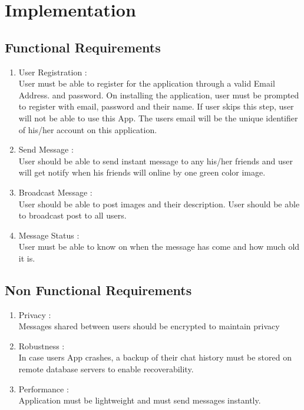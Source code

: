 \section{Implementation}
\subsection{Functional Requirements}

\begin{enumerate}
	\setlength{\itemsep}{-0.3em}
	\item User Registration : \\User must be able to register for the application through a valid Email Address. and password. On installing the application, user must be prompted to register with email, password and their name. If user skips this step, user will not be able to use this App. The users email will be the unique identifier of his/her account on this application.\\
	\item Send Message : \\User should be able to send instant message to any his/her friends and user will get notify when his friends will online by one green color image.\\
	\item Broadcast Message : \\ User should be able to post images and their description. User should be able
	to broadcast post to all users.\\
	\item Message Status :\\ User must be able to know on when the message has come and how much old it is.
\end{enumerate}

\subsection{Non Functional Requirements}

\begin{enumerate}
	\setlength{\itemsep}{-0.3em}
	\item Privacy :\\ Messages shared between users should be encrypted to maintain privacy\\
	\item Robustness : \\ In case users App crashes, a backup of their chat history must be
	stored on remote database servers to enable recoverability.
\\
	\item Performance : \\ Application must be lightweight and must send messages instantly.\\
\end{enumerate}

